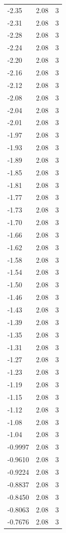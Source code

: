 \begin{longtable}{lrr}
  -2.35 & 2.08 & 3 \\
  -2.31 & 2.08 & 3 \\
  -2.28 & 2.08 & 3 \\
  -2.24 & 2.08 & 3 \\
  -2.20 & 2.08 & 3 \\
  -2.16 & 2.08 & 3 \\
  -2.12 & 2.08 & 3 \\
  -2.08 & 2.08 & 3 \\
  -2.04 & 2.08 & 3 \\
  -2.01 & 2.08 & 3 \\
  -1.97 & 2.08 & 3 \\
  -1.93 & 2.08 & 3 \\
  -1.89 & 2.08 & 3 \\
  -1.85 & 2.08 & 3 \\
  -1.81 & 2.08 & 3 \\
  -1.77 & 2.08 & 3 \\
  -1.73 & 2.08 & 3 \\
  -1.70 & 2.08 & 3 \\
  -1.66 & 2.08 & 3 \\
  -1.62 & 2.08 & 3 \\
  -1.58 & 2.08 & 3 \\
  -1.54 & 2.08 & 3 \\
  -1.50 & 2.08 & 3 \\
  -1.46 & 2.08 & 3 \\
  -1.43 & 2.08 & 3 \\
  -1.39 & 2.08 & 3 \\
  -1.35 & 2.08 & 3 \\
  -1.31 & 2.08 & 3 \\
  -1.27 & 2.08 & 3 \\
  -1.23 & 2.08 & 3 \\
  -1.19 & 2.08 & 3 \\
  -1.15 & 2.08 & 3 \\
  -1.12 & 2.08 & 3 \\
  -1.08 & 2.08 & 3 \\
  -1.04 & 2.08 & 3 \\
  -0.9997 & 2.08 & 3 \\
  -0.9610 & 2.08 & 3 \\
  -0.9224 & 2.08 & 3 \\
  -0.8837 & 2.08 & 3 \\
  -0.8450 & 2.08 & 3 \\
  -0.8063 & 2.08 & 3 \\
  -0.7676 & 2.08 & 3 \\

\end{longtable}
